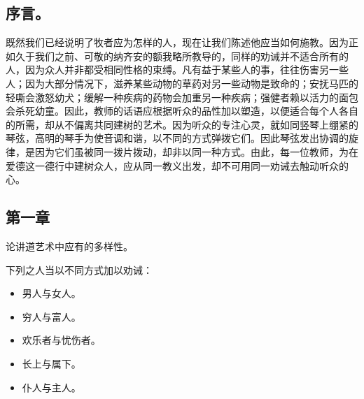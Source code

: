 \subsection{序言。}

既然我们已经说明了牧者应为怎样的人，现在让我们陈述他应当如何施教。因为正如久于我们之前、可敬的纳齐安的额我略所教导的，同样的劝诫并不适合所有的人，因为众人并非都受相同性格的束缚。凡有益于某些人的事，往往伤害另一些人；因为大部分情况下，滋养某些动物的草药对另一些动物是致命的；安抚马匹的轻嘶会激怒幼犬；缓解一种疾病的药物会加重另一种疾病；强健者赖以活力的面包会杀死幼童。因此，教师的话语应根据听众的品性加以塑造，以便适合每个人各自的所需，却从不偏离共同建树的艺术。因为听众的专注心灵，就如同竖琴上绷紧的琴弦，高明的琴手为使音调和谐，以不同的方式弹拨它们。因此琴弦发出协调的旋律，是因为它们虽被同一拨片拨动，却非以同一种方式。由此，每一位教师，为在爱德这一德行中建树众人，应从同一教义出发，却不可用同一劝诫去触动听众的心。\par


\subsection{第一章}

论讲道艺术中应有的多样性。\par

下列之人当以不同方式加以劝诫：\par

\begin{itemize}
\item 男人与女人。
\end{itemize}

\begin{itemize}
\item 穷人与富人。
\end{itemize}

\begin{itemize}
\item 欢乐者与忧伤者。
\end{itemize}

\begin{itemize}
\item 长上与属下。
\end{itemize}

\begin{itemize}
\item 仆人与主人。
\end{itemize}


